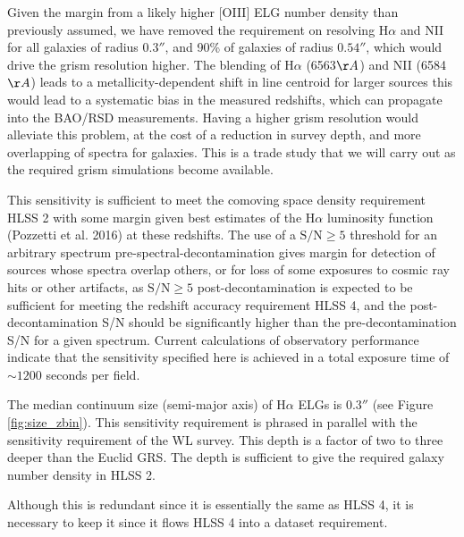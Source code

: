  Given the margin from a likely higher [OIII] ELG number density than previously
 assumed, we have removed the requirement on resolving H$\alpha$ and NII for all
 galaxies of radius $0.3''$, and 90\% of galaxies of radius $0.54''$, which would drive
 the grism resolution higher. The blending of H$\alpha$ (6563$\AA$) and NII (6584$\AA$) leads to
 a metallicity-dependent shift in line centroid for larger sources
 this would lead to a systematic bias in the measured redshifts, which can
 propagate into the BAO/RSD measurements. Having a higher grism resolution would
 alleviate this problem, at the cost of a reduction in survey depth, and more
 overlapping of spectra for galaxies. This is a trade study that we will carry out
 as the required grism simulations become available.


 This sensitivity is sufficient to meet the comoving space density requirement
 HLSS 2 with some margin given best estimates of the H$\alpha$ luminosity function
 (Pozzetti et al. 2016) at these redshifts. The use of a $\mathrm{S/N} \geq 5$ threshold for an arbitrary spectrum pre-spectral-decontamination gives margin for detection of sources whose spectra overlap others, or for loss of some exposures to cosmic ray hits or other artifacts, as $\mathrm{S/N} \geq 5$ post-decontamination is expected to be
 sufficient for meeting the redshift accuracy requirement HLSS 4, and the
 post-decontamination S/N should be significantly higher than the
 pre-decontamination S/N for a given spectrum. Current calculations of
 observatory performance indicate that the sensitivity specified here is achieved
 in a total exposure time of  $\sim1200$ seconds per field.

 The median continuum size (semi-major axis) of H$\alpha$ ELGs is $0.3''$ (see Figure \ref{fig:size_zbin}).
 This sensitivity requirement is phrased in parallel with the sensitivity requirement
 of the WL survey. This depth is a factor of two to three deeper than the Euclid
 GRS. The depth is sufficient to give the required galaxy number density in HLSS 2.


 Although this is redundant since it is essentially the same as HLSS 4, it is
 necessary to keep it since it flows HLSS 4 into a dataset requirement.

